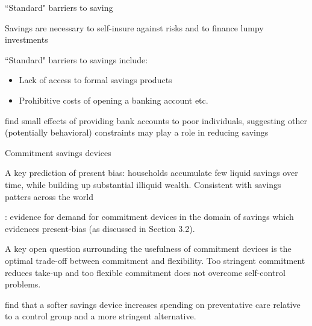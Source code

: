 \documentclass[aspectratio=169, 10pt, handout]{beamer}
\newenvironment{wideitemize}{\itemize\addtolength{\itemsep}{10pt}}{\enditemize}
\begin{document}
\begin{frame}{``Standard" barriers to saving}

\begin{wideitemize}

	\item Savings are necessary to self-insure against risks and to finance lumpy investments 

	\item ``Standard" barriers to savings include: 
	
	\begin{itemize}
	
		\item Lack of access to formal savings products

		\item Prohibitive costs of opening a banking account etc.

	\end{itemize}
	
	\item \cite{dupas2018banking} find small effects of providing bank accounts to poor individuals, suggesting other (potentially behavioral) constraints may play a role in reducing savings


\end{wideitemize}

\end{frame}

\begin{frame}{Commitment savings devices}

\begin{wideitemize}

	\item A key prediction of present bias: households accumulate few liquid savings over time, while building up substantial illiquid wealth. Consistent with savings patters across the world \citep{angeletos2001hyperbolic,Banerjee2007,morduch2009portfolios}

	\item \cite{ashraf2006tying}: evidence for demand for commitment devices in the domain of savings which evidences present-bias (as discussed in Section 3.2).

	\item A key open question surrounding the usefulness of commitment devices is the optimal trade-off between commitment and flexibility. Too stringent commitment reduces take-up and too flexible commitment does not overcome self-control problems.

	\item \cite{dupas2013savings} find that a softer savings device increases spending on preventative care relative to a control group and a more stringent alternative.


\end{wideitemize}

\end{frame}
\end{document}
